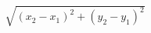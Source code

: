 \documentclass[preview]{standalone}
\begin{document}
\begin{align*}
\sqrt{(x_2-x_1)^2 + (y_2-y_1)^2}
\end{align*}
\end{document}
